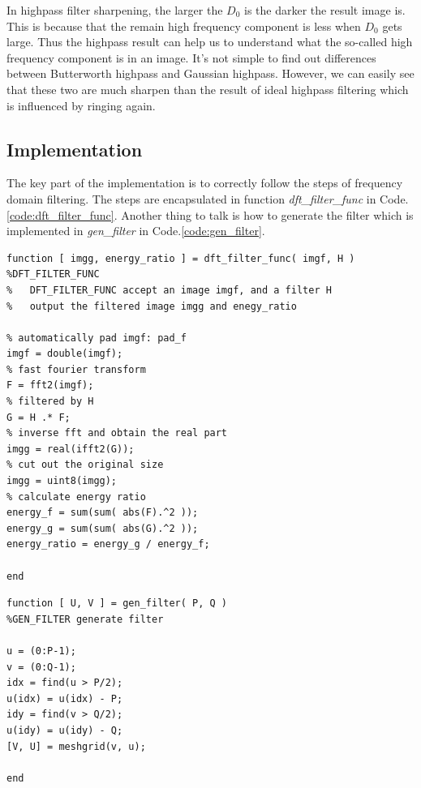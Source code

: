 In highpass filter sharpening, the larger the $D_0$ is the darker the result image is. This is because that the remain high frequency component is less when $D_0$ gets large. Thus the highpass result can help us to understand what the so-called high frequency component is in an image. It's not simple to find out differences between Butterworth highpass and Gaussian highpass. However, we can easily see that these two are much sharpen than the result of ideal highpass filtering which is influenced by ringing again.

\subsection{Implementation}
The key part of the implementation is to correctly follow the steps of frequency domain filtering. The steps are encapsulated in function \emph{dft\_filter\_func} in Code.\ref{code:dft_filter_func}. Another thing to talk is how to generate the filter which is implemented in \emph{gen\_filter} in Code.\ref{code:gen_filter}.

\clearpage
\lstset{language=Matlab}
\begin{lstlisting}
function [ imgg, energy_ratio ] = dft_filter_func( imgf, H )
%DFT_FILTER_FUNC 
%   DFT_FILTER_FUNC accept an image imgf, and a filter H
%   output the filtered image imgg and enegy_ratio

% automatically pad imgf: pad_f
imgf = double(imgf);
% fast fourier transform 
F = fft2(imgf);
% filtered by H
G = H .* F;
% inverse fft and obtain the real part
imgg = real(ifft2(G));
% cut out the original size
imgg = uint8(imgg);
% calculate energy ratio
energy_f = sum(sum( abs(F).^2 ));
energy_g = sum(sum( abs(G).^2 ));
energy_ratio = energy_g / energy_f;

end
\end{lstlisting}

\lstset{language=Matlab} 
\begin{lstlisting}
function [ U, V ] = gen_filter( P, Q )
%GEN_FILTER generate filter

u = (0:P-1);
v = (0:Q-1);
idx = find(u > P/2);
u(idx) = u(idx) - P;
idy = find(v > Q/2);
u(idy) = u(idy) - Q;
[V, U] = meshgrid(v, u);

end
\end{lstlisting}

